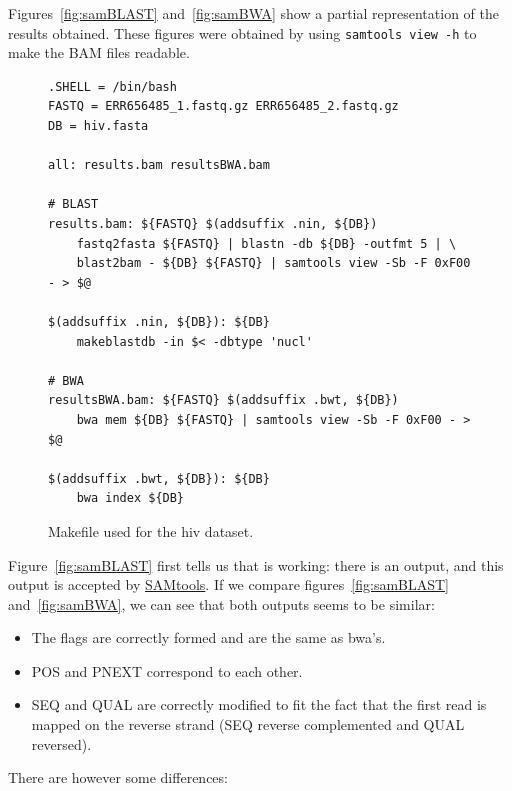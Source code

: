 Figures~\ref{fig:samBLAST} and~\ref{fig:samBWA} show a partial representation of the results obtained.
These figures were obtained by using \texttt{samtools view -h} to make the BAM files readable.

\begin{figure}
\begin{lstlisting}
.SHELL = /bin/bash
FASTQ = ERR656485_1.fastq.gz ERR656485_2.fastq.gz
DB = hiv.fasta

all: results.bam resultsBWA.bam

# BLAST
results.bam: ${FASTQ} $(addsuffix .nin, ${DB})
	fastq2fasta ${FASTQ} | blastn -db ${DB} -outfmt 5 | \
	blast2bam - ${DB} ${FASTQ} | samtools view -Sb -F 0xF00 - > $@

$(addsuffix .nin, ${DB}): ${DB}
	makeblastdb -in $< -dbtype 'nucl'

# BWA
resultsBWA.bam: ${FASTQ} $(addsuffix .bwt, ${DB})
	bwa mem ${DB} ${FASTQ} | samtools view -Sb -F 0xF00 - > $@

$(addsuffix .bwt, ${DB}): ${DB}
	bwa index ${DB}
\end{lstlisting}
\caption{Makefile used for the \acrshort{hiv} dataset.}\label{fig:hivMake}
\end{figure}

Figure~\ref{fig:samBLAST} first tells us that \blastobam{} is working: there is an output, and this output is accepted by \href{http://www.htslib.org/}{SAMtools}.
If we compare figures~\ref{fig:samBLAST} and~\ref{fig:samBWA}, we can see that both outputs seems to be similar:

\begin{itemize}
    \item The flags are correctly formed and are the same as \gls{bwa}'s.
    \item POS and PNEXT correspond to each other.
    \item SEQ and QUAL are correctly modified to fit the fact that the first read is mapped on the reverse strand (SEQ reverse complemented and QUAL reversed).
\end{itemize}

There are however some differences:

